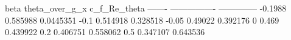    beta    theta_over_g_x    c_f_Re_theta
-------  ----------------  --------------
-0.1988          0.585988       0.0445351
-0.1             0.514918       0.328518
-0.05            0.49022        0.392176
 0               0.469          0.439922
 0.2             0.406751       0.558062
 0.5             0.347107       0.643536